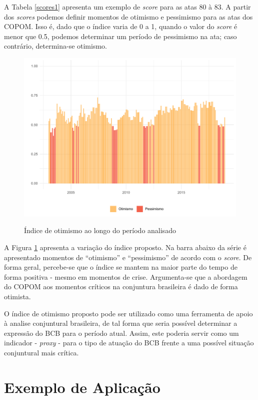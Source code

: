 A Tabela \ref{scores1} apresenta um exemplo de \textit{score} para as atas 80 à 83. A partir dos \textit{scores} podemos definir momentos de otimismo e pessimismo para as atas dos COPOM. Isso é, dado que o índice varia de 0 a 1, quando o valor do \textit{score} é menor que 0.5, podemos determinar um período de pessimismo na ata; caso contrário, determina-se otimismo.

\begin{figure}[!h]
    \centering
    \caption{Índice de otimismo ao longo do período analisado}
    \includegraphics[width=\textwidth]{capitulos/figures/graf_indice_ggplot.pdf}
    \label{fig:grafind}
\end{figure}


A Figura \ref{fig:grafind} apresenta a variação do índice proposto. Na barra abaixo da série é apresentado momentos de ``otimismo'' e ``pessimismo'' de acordo com o \textit{score}. De forma geral, percebe-se que o índice se mantem na maior parte do tempo de forma positiva - mesmo em momentos de crise. Argumenta-se que a abordagem do COPOM aos momentos críticos na conjuntura brasileira é dado de forma otimista. 

O índice de otimismo proposto pode ser utilizado como uma ferramenta de apoio à analise conjuntural brasileira, de tal forma que seria possível determinar a expressão do BCB para o período atual. Assim, este poderia servir como um indicador - \textit{proxy} - para o tipo de atuação do BCB frente a uma possível situação conjuntural mais crítica. 

\section{Exemplo de Aplicação}

